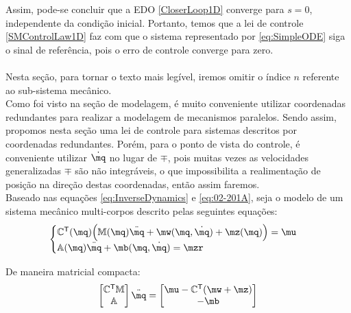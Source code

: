 Assim, pode-se concluir que a EDO \eqref{CloserLoop1D} converge para $s=0$, independente da condi\c{c}\~ao inicial. Portanto, temos que a lei de controle \eqref{SMControlLaw1D} faz com que o sistema representado por \eqref{eq:SimpleODE} siga o sinal de refer\^encia, pois o erro de controle converge para zero. \\

\\

Nesta se\c{c}\~ao, para tornar o texto mais leg\'ivel, iremos omitir o \'indice $n$ referente ao sub-sistema mec\^anico. \\

Como foi visto na se\c{c}\~ao de modelagem, \'e muito conveniente utilizar coordenadas redundantes para realizar a modelagem de mecanismos paralelos. Sendo assim, propomos nesta se\c{c}\~ao uma lei de controle para sistemas descritos por coordenadas redundantes. Por\'em, para o ponto de vista do controle, \'e conveniente utilizar $\dot{\mq}$ no lugar de $\mp$, pois muitas vezes as velocidades generalizadas $\mp$ s\~ao n\~ao integr\'aveis, o que impossibilita a realimenta\c{c}\~ao de posi\c{c}\~ao na dire\c{c}\~ao destas coordenadas, ent\~ao assim faremos. \\

Baseado nas equa\c{c}\~oes \eqref{eq:InverseDynamics} e \eqref{eq:02-201A}, seja o modelo de um sistema mec\^anico multi-corpos descrito pelas seguintes equa\c{c}\~oes:
\begin{equation} \label{eq:MechanicalSystem}
\begin{cases}
\mC^\msT (\mq) \Big( \mM (\mq) \ddot{\mq} + \mw (\mq, \dot{\mq}) + \mz (\mq) \Big) = \mu \\
\mA (\mq) \ddot{\mq} + \mb (\mq, \dot{\mq}) = \mzr
\end{cases}
\end{equation}

De maneira matricial compacta:
\begin{equation} \label{eq:MechanicalSystemMatrix}
\begin{bmatrix}
\mC^\msT \mM \\
\mA
\end{bmatrix}
\ddot{\mq}
=
\begin{bmatrix}
\mu - \mC^\msT(\mw + \mz) \\
-\mb
\end{bmatrix}
\end{equation}

